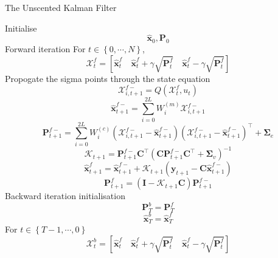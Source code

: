 \documentclass[12pt]{iopart}		%
\begin{document}
\begin{algorithm}
\caption{The Unscented Kalman Filter}\label{CPTEMDAlgorithm}
\begin{algorithmic}[1]
\State Initialise
\begin{equation*}
\hat{\mathbf x}_0, \mathbf P_0
\end{equation*}
\State Forward iteration
For $t \in \left\lbrace 0,\cdots, N\right\rbrace $,
\begin{equation*}
\mathcal X_t^f=[\hat{\mathbf x}_t^f \quad \hat{\mathbf x}_t^f+\gamma\sqrt{\mathbf P_t^f} \quad \hat{\mathbf x}_t^{f}-\gamma\sqrt{\mathbf P_t^f}]
\end{equation*}
Propogate the sigma points through the state equation
\begin{equation}
\mathcal X_{i,t+1}^{f-}=Q(\mathcal X_t^f,u_t)
\end{equation}
\begin{equation*}
 \hat{\mathbf x}_{t+1}^{f-}=\sum_{i=0}^{2L} W_i^{(m)}\mathcal X_{i,t+1}^{f-}
\end{equation*}
\begin{equation*}
 \mathbf P_{t +1}^{f-}=\sum_{i=0}^{2L} W_i^{(c)}(\mathcal X_{i,t+1}^{f-}-\hat{\mathbf x}_{t +1}^{f-})(\mathcal X_{i,t+1}^{f-}-\hat{\mathbf x}_{t +1}^{f-})^\top+\boldsymbol \Sigma_e
\end{equation*}
\begin{equation*}
\mathcal K_{t+1}=\mathbf P_{t +1}^{f-}\mathbf C ^\top(\mathbf C \mathbf P_{t +1}^{f-}\mathbf C ^\top+\boldsymbol \Sigma_v)^{-1}
\end{equation*}
\begin{equation*}
\hat{\mathbf x}_{t+1}^{f}=\hat{\mathbf x}_{t+1}^{f-}+\mathcal K_{t+1}(\mathbf y_{t+1}-\mathbf C\hat{\mathbf x}_{t +1}^{f-})
\end{equation*}
\begin{equation*}
 \mathbf P_{t+1}^f=(\mathbf I - \mathcal K_{t+1}\mathbf C)\mathbf P_{t +1}^{f-}
\end{equation*}
\State Backward iteration
\State initialisation
\begin{equation}
 \mathbf P_T^b= \mathbf P_T^f
\end{equation}
\begin{equation}
\hat{\mathbf x}^b_T= \hat{\mathbf x}^f_T
\end{equation}
For $t \in \left\lbrace T-1, \cdots, 0 \right\rbrace $
\begin{equation*}
\mathcal X_t^b=[\hat{\mathbf x}_t^f \quad \hat{\mathbf x}_t^f+\gamma\sqrt{\mathbf P_t^f} \quad \hat{\mathbf x}_t^f-\gamma\sqrt{\mathbf P_t^f}]

\end{equation*}
\end{algorithmic}
\end{algorithm}
\end{document}
